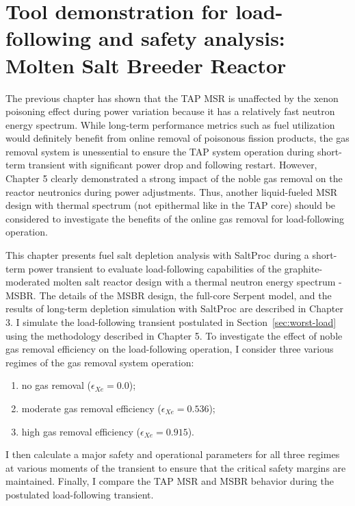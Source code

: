 \chapter{Tool demonstration for load-following and safety analysis: Molten 
Salt Breeder Reactor}
The previous chapter has shown that the \gls{TAP} \gls{MSR} is unaffected by 
the xenon poisoning effect during power variation because it has a relatively 
fast neutron energy spectrum. 
While long-term performance metrics such as fuel utilization would definitely 
benefit from online removal of poisonous fission products, the gas removal 
system is unessential to ensure the \gls{TAP} system operation during 
short-term transient with significant power drop and following restart. 
However, Chapter 5 clearly demonstrated a strong impact of the noble gas 
removal on the reactor neutronics during power adjustments. Thus, another 
liquid-fueled \gls{MSR} design with thermal spectrum (not epithermal like in 
the \gls{TAP} core) should be considered to investigate the benefits of the 
online gas removal for load-following operation.	

This chapter presents fuel salt depletion analysis with SaltProc during a
short-term power transient to evaluate load-following capabilities of the 
graphite-moderated molten salt reactor design with a thermal neutron energy 
spectrum - \gls{MSBR}. The details of the \gls{MSBR} design, the full-core 
Serpent model, and the results of long-term depletion simulation with SaltProc 
are described in Chapter 3. I simulate the load-following transient postulated 
in Section~\ref{sec:worst-load} using the methodology described in Chapter 5. 
To investigate the effect of noble gas removal efficiency on the 
load-following operation, I consider three various regimes of the gas removal 
system operation:
\begin{enumerate}[label=(\alph*), noitemsep, topsep=0pt]
	\item no gas removal ($\epsilon_{Xe}=0.0$);
	\item moderate gas removal efficiency ($\epsilon_{Xe}=0.536$);
	\item high gas removal efficiency ($\epsilon_{Xe}=0.915$).
\end{enumerate}
I then calculate a major safety and operational parameters for all three 
regimes at various moments of the transient to ensure that the critical 
safety margins are maintained. Finally, I compare the \gls{TAP} \gls{MSR} and 
\gls{MSBR} behavior during the postulated load-following transient.


